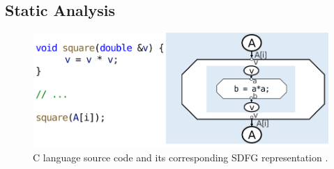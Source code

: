 \subsection{Static Analysis}\label{sec:static_analysis}
\begin{figure}
  \centering
  \includegraphics[width=\linewidth]{pictures/SDFG.png}
  \caption{C language source code and its corresponding SDFG representation \cite{calotoiu2022lifting}.}
  \label{fig:sdfg}
\end{figure}

